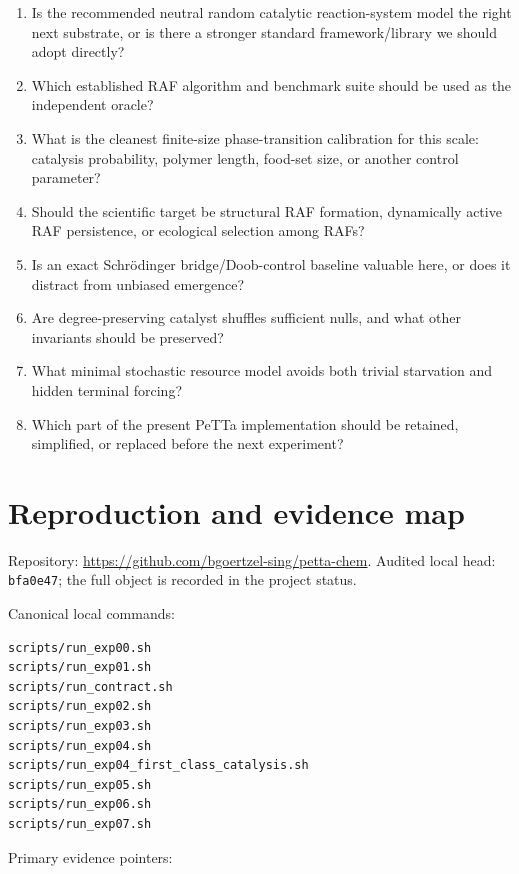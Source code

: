 \documentclass[11pt]{article}
\newcommand{\code}[1]{\texttt{#1}}
\begin{document}
\begin{enumerate}
\item Is the recommended neutral random catalytic reaction-system model the
      right next substrate, or is there a stronger standard framework/library
      we should adopt directly?
\item Which established RAF algorithm and benchmark suite should be used as
      the independent oracle?
\item What is the cleanest finite-size phase-transition calibration for this
      scale: catalysis probability, polymer length, food-set size, or another
      control parameter?
\item Should the scientific target be structural RAF formation, dynamically
      active RAF persistence, or ecological selection among RAFs?
\item Is an exact Schr\"odinger bridge/Doob-control baseline valuable here, or
      does it distract from unbiased emergence?
\item Are degree-preserving catalyst shuffles sufficient nulls, and what other
      invariants should be preserved?
\item What minimal stochastic resource model avoids both trivial starvation
      and hidden terminal forcing?
\item Which part of the present PeTTa implementation should be retained,
      simplified, or replaced before the next experiment?
\end{enumerate}

\section{Reproduction and evidence map}

Repository:
\url{https://github.com/bgoertzel-sing/petta-chem}.  Audited local head:
\code{bfa0e47}; the full object is recorded in the project status.

Canonical local commands:

\begin{verbatim}
scripts/run_exp00.sh
scripts/run_exp01.sh
scripts/run_contract.sh
scripts/run_exp02.sh
scripts/run_exp03.sh
scripts/run_exp04.sh
scripts/run_exp04_first_class_catalysis.sh
scripts/run_exp05.sh
scripts/run_exp06.sh
scripts/run_exp07.sh
\end{verbatim}

Primary evidence pointers:
\end{document}
